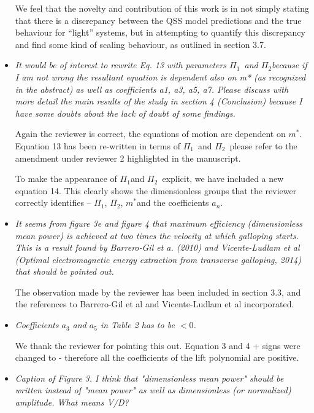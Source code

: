 \documentclass[]{article}
\newcommand{\mstar}{\ensuremath{m^{*}}}
\newcommand{\massstiff}{\ensuremath{\Pi_1}}
\newcommand{\massdamp}{\ensuremath{\Pi_2}}
\begin{document}
\begin{itemize}
We feel that the novelty and contribution of this work is in not simply stating that there is a discrepancy between the QSS model predictions and the true behaviour for ``light'' systems, but in attempting to quantify this discrepancy and find some kind of scaling behaviour, as outlined in section 3.7.
	
\item \emph{It would be of interest to rewrite Eq. 13 with parameters \massstiff \ and \massdamp because if I am not wrong the resultant equation is dependent also on m* (as recognized in the abstract) as well as coefficients a1, a3, a5, a7. Please discuss with more detail the main results of the study in section 4 (Conclusion) because I have some doubts about the lack of doubt of some findings.}
	
Again the reviewer is correct, the equations of motion are dependent on $m^*$. Equation 13 has been re-written in terms of \massstiff \ and \massdamp \ please refer to the amendment under reviewer 2 highlighted in the manuscript.

To make the appearance of \massstiff and \massdamp \ explicit, we have included a new equation 14. This clearly shows the dimensionless groups that the reviewer correctly identifies – \massstiff, \massdamp, \mstar and the coefficients $a_n$.

\item \emph{It seems from figure 3e and figure 4 that maximum efficiency (dimensionless mean power) is achieved at two times the velocity at which galloping starts. This is a result found by Barrero-Gil et a. (2010) and Vicente-Ludlam et al (Optimal electromagnetic energy extraction from transverse galloping, 2014) that should be pointed out.}

The observation made by the reviewer has been included in section 3.3, and the references to Barrero-Gil et al and Vicente-Ludlam et al incorporated.

\item \emph{Coefficients $a_3$  and $a_5$ in Table 2 has to be $<0$.}

We thank the reviewer for pointing this out. Equation 3 and 4 {+} signs were changed to {-} therefore all the coefficients of the lift polynomial are positive.
 
\item \emph{Caption of Figure 3. I think that "dimensionless mean power" should be written instead of "mean power" as well as dimensionless (or normalized) amplitude. What means V/D?}


\end{itemize}
\end{document}
